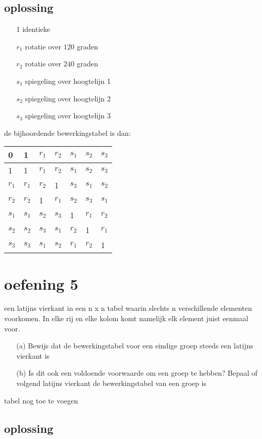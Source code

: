 \documentclass[12pt,a4paper]{article}
\begin{document}
\subsection*{oplossing}
\begin{itemize}
\item[1]
identieke
\item[$r_1$]
rotatie over $120$ graden
\item[$r_2$]
rotatie over $240$ graden
\item[$s_1$]
spiegeling over hoogtelijn 1
\item[$s_2$]
spiegeling over hoogtelijn 2
\item[$s_3$]
spiegeling over hoogtelijn 3
\end{itemize}
\[
\]
de bijhoordende bewerkingstabel is dan:
\\
\begin{tabular}{l| l l l l l l}

  0 & 1 & $r_1$ & $r_2$  & $s_1$ & $s_2$ & $s_3$\\
  \hline
 1&1& $r_1$ & $r_2$ & $s_1$ & $s_2$ & $s_3$\\
 $r_1$ & $r_1$ & $r_2$ & 1 &$s_3$ &$s_1$&$s_2$\\
 $r_2$ & $r_2$ & 1 & $r_1$ & $s_2$ & $s_3$ & $s_1$\\
 $s_1$ & $s_1$ & $s_2$ & $s_3$ & 1 &$r_1$ & $r_2$\\
 $s_2$ & $s_2$ & $s_3$ & $s_1$ & $r_2$ & 1 & $r_1$\\
 $s_3$ & $s_3$ & $s_1$ & $s_2$ & $r_1$ & $r_2$ & 1
 
\end{tabular}

\section{oefening 5}
een latijns vierkant in een n x n tabel waarin slechts n verschillende elementen voorkomen. In elke rij en elke kolom komt namelijk elk element juist eenmaal voor.
\begin{itemize}
\item[(a)] Bewijs dat de bewerkingstabel voor een eindige groep steeds een latijns vierkant is
\item[(b)] Is dit ook een voldoende voorwaarde om een groep te hebben? Bepaal of volgend latijns vierkant de bewerkingstabel van een groep is
\end{itemize}
tabel nog toe te voegen

\newpage
\subsection*{oplossing}
\end{document}
